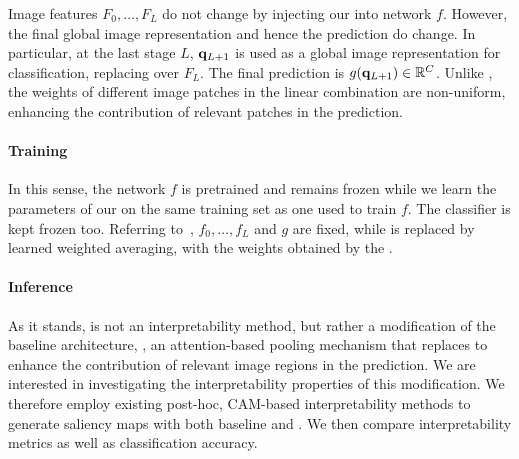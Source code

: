 Image features $F_0, \dots, F_L$ do not change by injecting our \Ours into network $f$. However, the final global image representation and hence the prediction do change. In particular, at the last stage $L$, $\mathbf{q}_{L+1}$ is used as a global image representation for classification, replacing \gap over $F_L$. The final prediction is $g(\mathbf{q}_{L+1}) \in \mathbb{R}^C$. Unlike \gap, the weights of different image patches in the linear combination are non-uniform, enhancing the contribution of relevant patches in the prediction.




\paragraph{Training}

In this sense, the network $f$ is pretrained and remains frozen while we learn the parameters of our \Ours on the same training set as one used to train $f$. The classifier is kept frozen too. Referring to~, $f_0, \dots, f_L$ and $g$ are fixed, while \gap is replaced by learned weighted averaging, with the weights obtained by the \Ours.

\paragraph{Inference}

As it stands, \Ours is not an interpretability method, but rather a modification of the baseline architecture, \ie, an attention-based pooling mechanism that replaces \gap to enhance the contribution of relevant image regions in the prediction. We are interested in investigating the interpretability properties of this modification. We therefore employ existing post-hoc, CAM-based interpretability methods to generate saliency maps with both baseline \gap and \Ours. We then compare interpretability metrics as well as classification accuracy.

